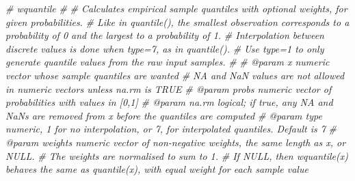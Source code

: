 \documentclass[
]{article}
\newenvironment{Shaded}{\begin{snugshade}}{\end{snugshade}}
\newcommand{\CommentTok}[1]{\textcolor[rgb]{0.56,0.35,0.01}{\textit{#1}}}
\begin{document}
\begin{Shaded}
\begin{Highlighting}[]
\CommentTok{\#\textquotesingle{} wquantile }
\CommentTok{\#\textquotesingle{}}
\CommentTok{\#\textquotesingle{} Calculates empirical sample quantiles with optional weights, for given probabilities. }
\CommentTok{\#\textquotesingle{} Like in quantile(), the smallest observation corresponds to a probability of 0 and the largest to a probability of 1. }
\CommentTok{\#\textquotesingle{} Interpolation between discrete values is done when type=7, as in quantile(). }
\CommentTok{\#\textquotesingle{} Use type=1 to only generate quantile values from the raw input samples.}
\CommentTok{\#\textquotesingle{}}
\CommentTok{\#\textquotesingle{} @param x numeric vector whose sample quantiles are wanted}
\CommentTok{\#\textquotesingle{} NA and NaN values are not allowed in numeric vectors unless na.rm is TRUE}
\CommentTok{\#\textquotesingle{} @param probs numeric vector of probabilities with values in [0,1]}
\CommentTok{\#\textquotesingle{} @param na.rm logical; if true, any NA and NaN\textquotesingle{}s are removed from x before the quantiles are computed}
\CommentTok{\#\textquotesingle{} @param type numeric, 1 for no interpolation, or 7, for interpolated quantiles. Default is 7}
\CommentTok{\#\textquotesingle{} @param weights    numeric vector of non{-}negative weights, the same length as x, or NULL. }
\CommentTok{\#\textquotesingle{} The weights are normalised to sum to 1. }
\CommentTok{\#\textquotesingle{} If NULL, then wquantile(x) behaves the same as quantile(x), with equal weight for each sample value}


\end{Highlighting}
\end{Shaded}
\end{document}
